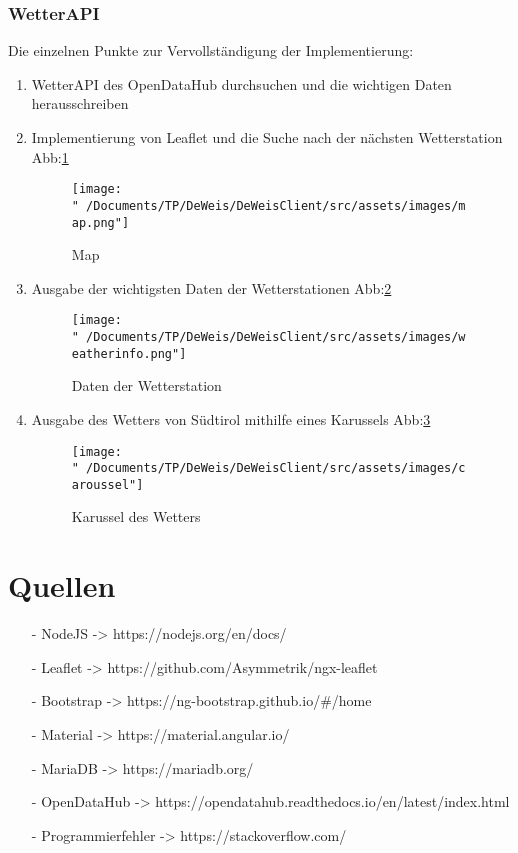 \documentclass{scrartcl}
\begin{document}
    \subsubsection{WetterAPI}

    Die einzelnen Punkte zur Vervollständigung der Implementierung:
    \begin{enumerate}
    \item WetterAPI des OpenDataHub durchsuchen und die wichtigen Daten herausschreiben
    \item Implementierung von Leaflet und die Suche nach der nächsten Wetterstation Abb:\ref{fig:map}
    \begin{figure}[h]
    \centering
    \texttt{[image: "~/Documents/TP/DeWeis/DeWeisClient/src/assets/images/map.png"]}
    \caption{Map}
    \label{fig:map}
    \end{figure}
    \item Ausgabe der wichtigsten Daten der Wetterstationen Abb:\ref{fig:weath}
    \begin{figure}[!h]
    \centering
    \texttt{[image: "~/Documents/TP/DeWeis/DeWeisClient/src/assets/images/weatherinfo.png"]}
    \caption{Daten der Wetterstation}
    \label{fig:weath}
    \end{figure}
    \item Ausgabe des Wetters von Südtirol mithilfe eines Karussels Abb:\ref{fig:caroussel}
    \begin{figure}[!h]
    \centering
    \texttt{[image: "~/Documents/TP/DeWeis/DeWeisClient/src/assets/images/caroussel"]}
    \caption{Karussel des Wetters}
    \label{fig:caroussel}
    \end{figure}
    \end{enumerate}

    \section{Quellen}
    \begin{itemize}
    \item[-] NodeJS -> https://nodejs.org/en/docs/
    \item[-] Leaflet -> https://github.com/Asymmetrik/ngx-leaflet
    \item[-] Bootstrap -> https://ng-bootstrap.github.io/\#/home
    \item[-] Material -> https://material.angular.io/
    \item[-] MariaDB -> https://mariadb.org/
    \item[-] OpenDataHub -> https://opendatahub.readthedocs.io/en/latest/index.html
    \item[-] Programmierfehler -> https://stackoverflow.com/
    \end{itemize}

    
\end{document}
